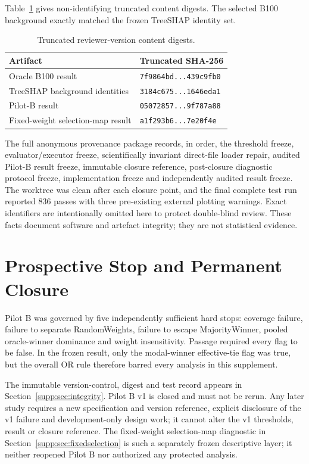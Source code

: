 \documentclass[runningheads]{llncs}
\begin{document}
Table~\ref{supp:tab:digests} gives non-identifying truncated content digests. The selected B100
background exactly matched the frozen TreeSHAP identity set.

\begin{table}[t]
\centering
\caption{Truncated reviewer-version content digests.}
\label{supp:tab:digests}
\small
\begin{tabular}{@{}ll@{}}
\toprule
Artifact & Truncated SHA-256\\
\midrule
Oracle B100 result & \texttt{7f9864bd...439c9fb0}\\
TreeSHAP background identities & \texttt{3184c675...1646eda1}\\
Pilot-B result & \texttt{05072857...9f787a88}\\
Fixed-weight selection-map result & \texttt{a1f293b6...7e20f4e}\\
\bottomrule
\end{tabular}
\end{table}

The full anonymous provenance package records, in order, the
threshold freeze, evaluator/executor freeze, scientifically invariant direct-file loader repair,
audited Pilot-B result freeze, immutable closure reference, post-closure diagnostic protocol
freeze, implementation freeze and independently audited result freeze. The worktree was clean
after each closure point, and the final complete test run reported 836 passes with three
pre-existing external plotting warnings.
Exact identifiers are intentionally omitted here to protect double-blind review. These facts
document software and artefact integrity; they are not statistical evidence.

\section{Prospective Stop and Permanent Closure}

Pilot B was governed by five independently sufficient hard stops: coverage failure, failure to
separate RandomWeights, failure to escape MajorityWinner, pooled oracle-winner dominance and
weight insensitivity. Passage required every flag to be false. In the frozen result, only the
modal-winner effective-tie flag was true, but the overall OR rule therefore barred every
analysis in this supplement.

The immutable version-control, digest and test record appears in
Section~\ref{supp:sec:integrity}. Pilot B v1 is closed and must not be rerun. Any later study
requires a new specification and version reference, explicit disclosure of the v1 failure and
development-only design work; it cannot alter the v1 thresholds, result or closure reference.
The fixed-weight selection-map diagnostic in Section~\ref{supp:sec:fixedselection} is such a
separately frozen descriptive layer; it neither reopened Pilot B nor authorized any protected
analysis.
\end{document}
